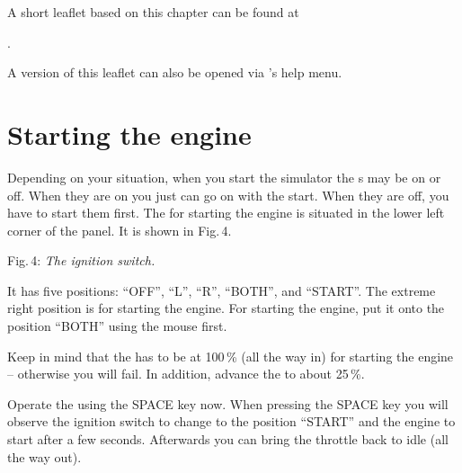A short leaflet based on this chapter can be found at
 \medskip

.
 \medskip

\noindent
A version of this leaflet can also be opened via \FlightGear{}'s help menu.

\section{Starting the engine}

Depending on your situation, when you start the simulator the
s may be on or off. When they are on you just can go on
with the start. When they are off, you have to start them first. The
 for starting the engine is situated in the
lower left corner of the panel. It is shown in Fig.\,4.
\medskip

 \centerline{}

\smallskip
 \noindent
Fig.\,4: \textit{The ignition switch.}
\medskip

It has five positions: ``OFF'', ``L'', ``R'', ``BOTH'', and ``START''. 
The extreme right position is for starting the engine. For starting the
engine, put it onto the position ``BOTH'' using the mouse first.

Keep in mind that the  has to be at 100\,\% (all
the way in) for starting the engine -- otherwise you will fail. In
addition, advance the  to about 25\,\%.

Operate the  using the SPACE key now. When pressing the
SPACE key you will observe the ignition switch to change to the
position ``START'' and the engine to start after a few seconds. 
Afterwards you can bring the throttle back to idle (all the way out).

